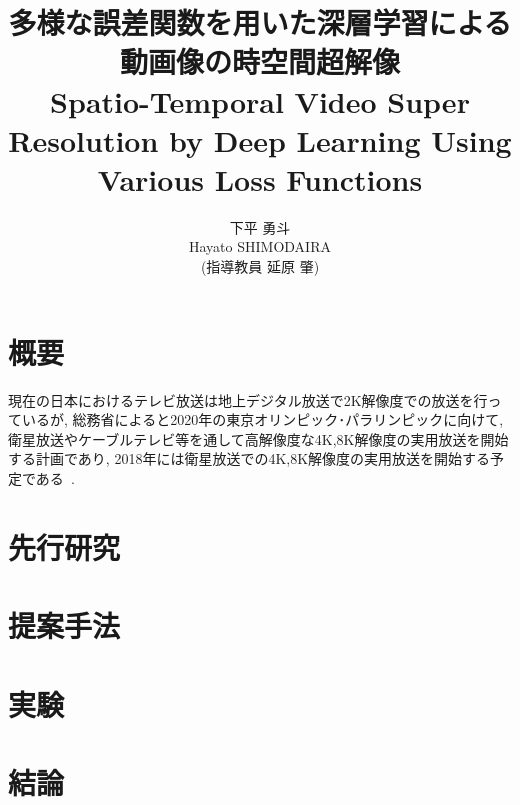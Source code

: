 \documentclass[twocolumn,a4j,uplatex]{jsarticle}
\title{{\Large 多様な誤差関数を用いた深層学習による動画像の時空間超解像} \\
Spatio-Temporal Video Super Resolution by Deep Learning Using Various Loss Functions}
\author{{\Large 下平 勇斗} \\ Hayato SHIMODAIRA \\ (指導教員 延原 肇)}
\begin{document}
\maketitle
\thispagestyle{headings}
\section{概要}
現在の日本におけるテレビ放送は地上デジタル放送で2K解像度での放送を行っているが,
総務省によると2020年の東京オリンピック･パラリンピックに向けて,
衛星放送やケーブルテレビ等を通して高解像度な4K,8K解像度の実用放送を開始する計画であり,
2018年には衛星放送での4K,8K解像度の実用放送を開始する予定である~\cite{soumu}.

\section{先行研究}
\section{提案手法}
\section{実験}
\section{結論}




\end{document}
